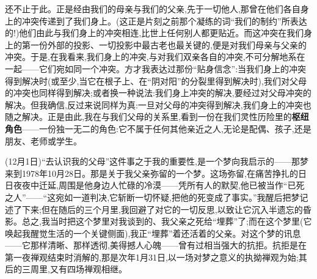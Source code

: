还不止于此。正是经由我们的母亲与我们的父亲,先于一切他人,那曾在他们各自身上的冲突传递到了我们身上。(这正是片刻之前那个凝练的词“我们的制约”所表达的!)他们由此与我们身上的冲突相连,比世上任何别人都更贴近。而这冲突在我们身上的第一份外部的投影、一切投影中最古老也最关键的,便是对我们母亲与父亲的冲突。于是,在我看来,我们身上的冲突,与对我们双亲各自的冲突,不可分解地系在一起——它们宛如同一个冲突。方才我表达过那份“贴身信念”:当我们身上的冲突得到解决时(或至少,当它在根子上、在“阴对阳”的分裂里得到解决时),我们对父母的冲突也同样得到解决;或者换一种说法:我们身上冲突的解决,要经过对父母冲突的解决。但我确信,反过来说同样为真:一旦对父母的冲突得到解决,我们身上的冲突也随之解决。正是由此,我在与我们父母的关系里,看到一份在我们灵性历险里的\textbf{枢纽角色}——一份独一无二的角色:它不属于任何其他亲近之人,无论是配偶、孩子,还是朋友、老师或学生。

\asterisms

\label{ch18:local:n34}

\dmark{}(12月1日)“去认识我的父母”这件事之于我的重要性,是一个梦向我启示的——那梦来到1978年10月28日。那是关于我父亲弥留的一个梦。这场弥留,在痛苦挣扎的日日夜夜中迁延,周围是他身边人忙碌的冷漠——凭所有人的默契,他已被当作“已死之人”——“这宛如一道判决,它斩断一切怀疑,把他的死变成了事实。”我醒后把梦记述了下来;但在随后的三个月里,我回避了对它的一切反思,以致让它沉入半遗忘的昏影。总之,我当时把这个梦里对我谈到的、我父亲之死给“埋葬”了;而在这个梦里(它唤起我醒觉生活的一个关键侧面),我正“埋葬”着还活着的父亲。对这个梦的讯息——它那样清晰、那样透彻,美得撼人心魄——曾有过相当强大的抗拒。抗拒是在第一夜禅观结束时消解的,那是次年1月31日,以一场对梦之意义的执拗禅观为始;其后的三周里,又有四场禅观相继。

